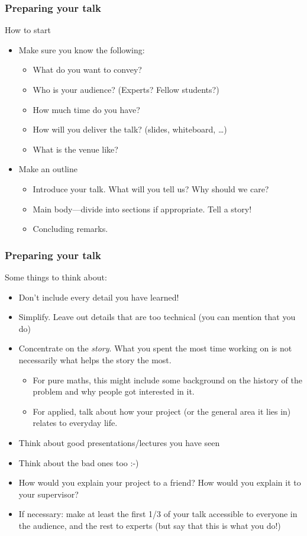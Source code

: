 \documentclass[t]{beamer} %
\begin{document}
\begin{frame}
\frametitle{Preparing your talk}
How to start
\begin{itemize}
\item Make sure you know the following:
\begin{itemize}
\item What do you want to convey? 
\item Who is your audience? (Experts? Fellow students?)
\item How much time do you have?
\item How will you deliver the talk? (slides, whiteboard, \ldots)
\item What is the venue like? 
\end{itemize}

\pause

\item Make an outline
\begin{itemize}
\item Introduce your talk. What will you tell us?  Why should we care? 
\item Main body---divide into sections if appropriate. Tell a story!
\item Concluding remarks.
\end{itemize}
\end{itemize}
\end{frame}

\begin{frame}
\frametitle{Preparing your talk}

Some things to think about:
\begin{itemize}
\item Don't include every detail you have learned!
\item Simplify. Leave out details that are too technical (you can mention that you do)
\item Concentrate on the \emph{story}. What you spent the most time working on is not necessarily what helps the story the most. 
\begin{itemize}
\item For pure maths, this might include some background on the history
of the problem and why people got interested in it.
\item For applied, talk about how your project (or the general area it
lies in) relates to everyday life.
\end{itemize}
\pause
\item Think about good presentations/lectures you have seen
\item Think about the bad ones too :-)
\item How would you explain your project to a friend? How would you explain it to your supervisor? 
\item If necessary: make at least the first 1/3 of your talk accessible
to everyone in the audience, and the rest to experts (but say that this is what you do!)
\end{itemize}
\end{frame}
\end{document}
